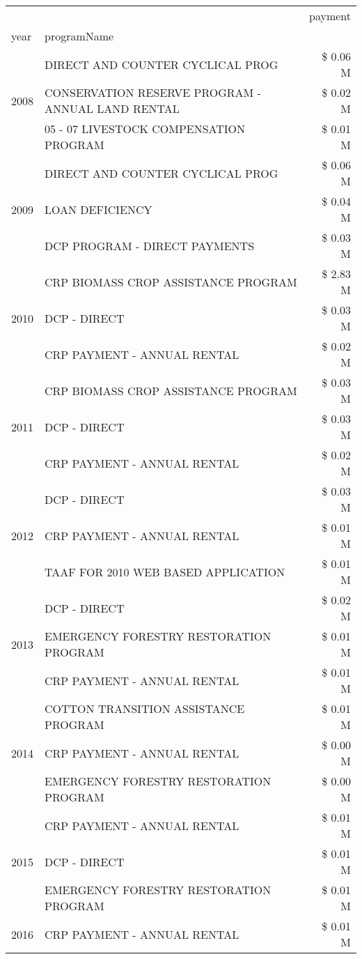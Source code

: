\begin{tabular}{llr}
\toprule
 &  & payment \\
year & programName &  \\
\midrule
\multirow[t]{3}{*}{2008} & DIRECT AND COUNTER CYCLICAL PROG & \$ 0.06 M \\
 & CONSERVATION RESERVE PROGRAM - ANNUAL LAND RENTAL & \$ 0.02 M \\
 & 05 - 07 LIVESTOCK COMPENSATION PROGRAM & \$ 0.01 M \\
\cline{1-3}
\multirow[t]{3}{*}{2009} & DIRECT AND COUNTER CYCLICAL PROG & \$ 0.06 M \\
 & LOAN DEFICIENCY & \$ 0.04 M \\
 & DCP PROGRAM - DIRECT PAYMENTS & \$ 0.03 M \\
\cline{1-3}
\multirow[t]{3}{*}{2010} & CRP BIOMASS CROP ASSISTANCE PROGRAM & \$ 2.83 M \\
 & DCP - DIRECT & \$ 0.03 M \\
 & CRP PAYMENT - ANNUAL RENTAL & \$ 0.02 M \\
\cline{1-3}
\multirow[t]{3}{*}{2011} & CRP BIOMASS CROP ASSISTANCE PROGRAM & \$ 0.03 M \\
 & DCP - DIRECT & \$ 0.03 M \\
 & CRP PAYMENT - ANNUAL RENTAL & \$ 0.02 M \\
\cline{1-3}
\multirow[t]{3}{*}{2012} & DCP - DIRECT & \$ 0.03 M \\
 & CRP PAYMENT - ANNUAL RENTAL & \$ 0.01 M \\
 & TAAF FOR 2010 WEB BASED APPLICATION & \$ 0.01 M \\
\cline{1-3}
\multirow[t]{3}{*}{2013} & DCP - DIRECT & \$ 0.02 M \\
 & EMERGENCY FORESTRY RESTORATION PROGRAM & \$ 0.01 M \\
 & CRP PAYMENT - ANNUAL RENTAL & \$ 0.01 M \\
\cline{1-3}
\multirow[t]{3}{*}{2014} & COTTON TRANSITION ASSISTANCE PROGRAM & \$ 0.01 M \\
 & CRP PAYMENT - ANNUAL RENTAL & \$ 0.00 M \\
 & EMERGENCY FORESTRY RESTORATION PROGRAM & \$ 0.00 M \\
\cline{1-3}
\multirow[t]{3}{*}{2015} & CRP PAYMENT - ANNUAL RENTAL & \$ 0.01 M \\
 & DCP - DIRECT & \$ 0.01 M \\
 & EMERGENCY FORESTRY RESTORATION PROGRAM & \$ 0.01 M \\
\cline{1-3}
\multirow[t]{3}{*}{2016} & CRP PAYMENT - ANNUAL RENTAL & \$ 0.01 M \\

\end{tabular}
